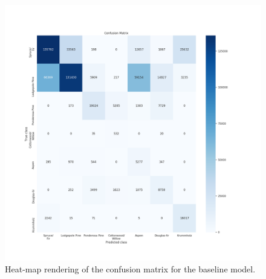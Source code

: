 \begin{figure}
\centering
\includegraphics[width=\textwidth]{./TeX_files/img/baselineconfmatheatmap.png}
\caption{Heat-map rendering of the confusion matrix for the baseline model.}
\label{fig:baselineconfmatheatmap}
\end{figure}

